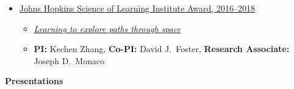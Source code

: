 \documentclass[10pt]{article}
\begin{document}
\begin{itemize}
\begin{itemize}
\end{itemize}

\item \href{http://scienceoflearning.jhu.edu/research/learning-to-explore-paths-through-space/}{
  Johns Hopkins Science of Learning Institute Award, 2016--2018}

\begin{itemize}
\item \href{http://scienceoflearning.jhu.edu/research/learning-to-explore-paths-through-space/}{
  \emph{Learning to explore paths through space}}

\item \textbf{PI:} Kechen Zhang, \textbf{Co-PI:} David J.~Foster,
\textbf{Research Associate:} Joseph D.~Monaco

\end{itemize}

\end{itemize}

{\large \textbf{Presentations}}
\end{document}
